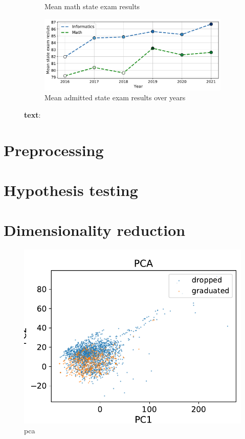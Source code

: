 \documentclass{article}
\begin{document}
\begin{figure}[htb]
\begin{subfigure}{0.49\textwidth}
    \caption{Mean math state exam results}
    \label{fig:input}
  \end{subfigure}
  \begin{subfigure}{0.98\textwidth}
    \includegraphics[width=\linewidth]{../gfx/ege_trend.pdf}
    \caption{Mean admitted state exam results over years}
    \label{fig:detection3D}
  \end{subfigure}\hfil

  \caption{\textbf{text}: }
\end{figure}

\section{Preprocessing}

\section{Hypothesis testing}

\section{Dimensionality reduction}

\begin{figure}[htb]
  \centering %

  \includegraphics[width=1\linewidth]{../gfx/pca_tsne.pdf}
  \caption{pca}
  \label{fig:applot}
\end{figure}
\end{document}
